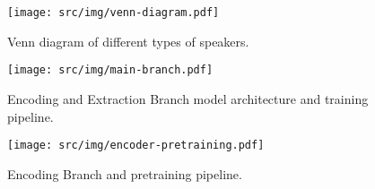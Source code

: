 \begin{figure}[!t]
\begin{center}
\centerline{\texttt{[image: src/img/venn-diagram.pdf]}}
\caption{Venn diagram of different types of speakers.}
\label{fig:venn-diagram}
\end{center}
\vskip -0.3in
\end{figure}

\begin{figure*}[!t]
\begin{center}
\centerline{\texttt{[image: src/img/main-branch.pdf]}}
\caption{Encoding and Extraction Branch model architecture and training pipeline.}
\label{fig:main-branch}
\end{center}
\vskip -0.3in
\end{figure*}

\begin{figure}[ht]
\begin{center}
\centerline{\texttt{[image: src/img/encoder-pretraining.pdf]}}
\caption{Encoding Branch and pretraining pipeline.}
\label{fig:encoder-pretraining}
\end{center}
\vskip -0.4in
\end{figure}



